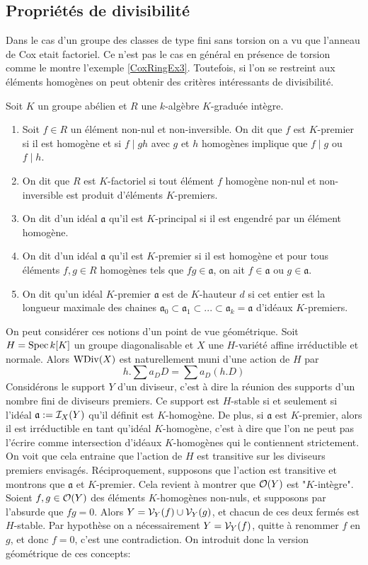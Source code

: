 \subsection{Propriétés de divisibilité}

Dans le cas d'un groupe des classes de type fini sans torsion on a vu que l'anneau de Cox etait factoriel. Ce n'est pas le cas en général en présence de torsion comme le montre l'exemple \ref{CoxRingEx3}. Toutefois, si l'on se restreint aux éléments homogènes on peut obtenir des critères intéressants de divisibilité. 

\begin{defn}
Soit $K$ un groupe abélien et $R$ une $k$-algèbre $K$-graduée intègre.
\begin{enumerate}
\item Soit $f\in R$ un élément non-nul et non-inversible. On dit que $f$ est $K$-premier si il est homogène et si $f\mid gh$ avec $g$ et $h$ homogènes implique que $f\mid g$ ou $f\mid h$.
\item On dit que $R$ est $K$-factoriel si tout élément $f$ homogène non-nul et non-inversible est produit d'éléments $K$-premiers.
\item On dit d'un idéal $\mathfrak{a}$ qu'il est $K$-principal si il est engendré par un élément homogène.
\item On dit d'un idéal $\mathfrak{a}$ qu'il est $K$-premier si il est homogène et pour tous éléments $f,g\in R$ homogènes tels que $fg\in\mathfrak{a}$, on ait $f\in\mathfrak{a}$ ou $g\in\mathfrak{a}$.
\item On dit qu'un idéal $K$-premier $\mathfrak{a}$ est de $K$-hauteur $d$ si cet entier est la longueur maximale des chaines $\mathfrak{a}_0\subset \mathfrak{a}_1\subset ...\subset \mathfrak{a}_k=\mathfrak{a}$ d'idéaux $K$-premiers.
\end{enumerate}
\end{defn}

On peut considérer ces notions d'un point de vue géométrique. Soit $H=\operatorname{Spec} k[K]$ un groupe diagonalisable et $X$ une $H$-variété affine irréductible et normale. Alors $\operatorname{WDiv}(X)$ est naturellement muni d'une action de $H$ par 
$$h.\sum a_DD=\sum a_D(h.D)$$
Considérons le support $Y$ d'un diviseur, c'est à dire la réunion des supports d'un nombre fini de diviseurs premiers. Ce support est $H$-stable si et seulement si l'idéal $\mathfrak{a}:=\mathcal{I}_X(Y)$ qu'il définit est $K$-homogène. De plus, si $\mathfrak{a}$ est $K$-premier, alors il est irréductible en tant qu'idéal $K$-homogène, c'est à dire que l'on ne peut pas l'écrire comme intersection d'idéaux $K$-homogènes qui le contiennent strictement. On voit que cela entraine que l'action de $H$ est transitive sur les diviseurs premiers envisagés. Réciproquement, supposons que l'action est transitive et montrons que $\mathfrak{a}$ et $K$-premier. Cela revient à montrer que $\mathcal{O}(Y)$ est "$K$-intègre". Soient $f,g\in \mathcal{O}(Y)$ des éléments $K$-homogènes non-nuls, et supposons par l'absurde que $fg=0$. Alors $Y=\mathcal{V}_Y(f)\cup\mathcal{V}_Y(g)$, et chacun de ces deux fermés est $H$-stable. Par hypothèse on a nécessairement $Y=\mathcal{V}_Y(f)$, quitte à renommer $f$ en $g$, et donc $f=0$, c'est une contradiction. On introduit donc la version géométrique de ces concepts:

